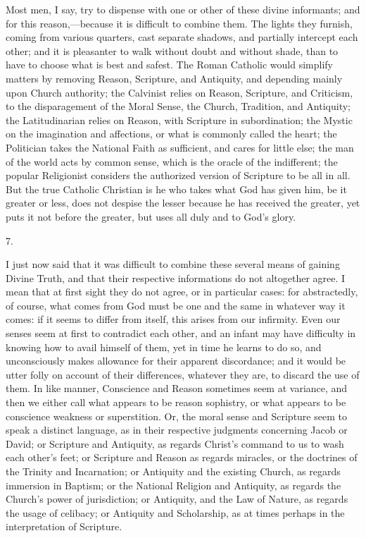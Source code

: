 Most men, I say, try to dispense with one or other of these divine
informants; and for this reason,—because it is difficult to combine
them. The lights they furnish, coming from various quarters, cast
separate shadows, and partially intercept each other; and it is
pleasanter to walk without doubt and without shade, than to have to
choose what is best and safest. The Roman Catholic would simplify
matters by removing Reason, Scripture, and Antiquity, and depending
mainly upon Church authority; the Calvinist relies on Reason,
Scripture, and Criticism, to the disparagement of the Moral Sense, the
Church, Tradition, and Antiquity; the Latitudinarian relies on Reason,
with Scripture in subordination; the Mystic on the imagination and
affections, or what is commonly called the heart; the Politician takes
the National Faith as sufficient, and cares for little else; the man
of the world acts by common sense, which is the oracle of the
indifferent; the popular Religionist considers the authorized version
of Scripture to be all in all. But the true Catholic Christian is he
who takes what God has given him, be it greater or less, does not
despise the lesser because he has received the greater, yet puts it
not before the greater, but uses all duly and to God's glory.

7.

I just now said that it was difficult to combine these several
means of gaining Divine Truth, and that their respective informations
do not altogether agree. I mean that at first sight they do not agree,
or in particular cases: for abstractedly, of course, what comes from
God must be one and the same in whatever way it comes: if it
seems to differ from itself, this arises from our infirmity. Even our
senses seem at first to contradict each other, and an infant may have
difficulty in knowing how to avail himself of them, yet in time he
learns to do so, and unconsciously makes allowance for their apparent
discordance; and it would be utter folly on account of their
differences, whatever they are, to discard the use of them. In like
manner, Conscience and Reason sometimes seem at variance, and then we
either call what appears to be reason sophistry, or what appears to be
conscience weakness or superstition. Or, the moral sense and Scripture
seem to speak a distinct language, as in their respective judgments
concerning Jacob or David; or Scripture and Antiquity, as regards
Christ's command to us to wash each other's feet; or Scripture and
Reason as regards miracles, or the doctrines of the Trinity and
Incarnation; or Antiquity and the existing Church, as regards
immersion in Baptism; or the National Religion and Antiquity, as
regards the Church's power of jurisdiction; or Antiquity, and the Law
of Nature, as regards the usage of celibacy; or Antiquity and
Scholarship, as at times perhaps in the interpretation of Scripture.

